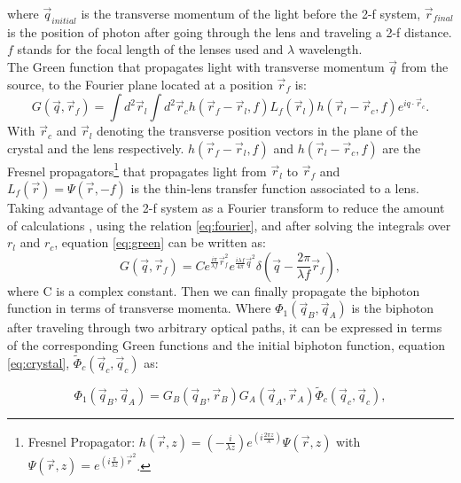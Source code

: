 where $\vec{q}_{initial}$ is the transverse momentum of the light before the 2-f system, $\vec{r}_{final}$ is the position of photon
after going through the lens and traveling a 2-f distance. $f$ stands for the focal length of the lenses used and $\lambda$ wavelength.\\
The Green function that propagates light with transverse momentum $\vec{q}$ from the source, to the
Fourier plane located at a position $\vec{r}_f$ is\cite{green}:
\begin{equation}\label{eq:green}
G(\vec{q},\vec{r}_f) = \int d^2 \vec{r}_l \int d^2 \vec{r}_c h(\vec{r}_f - \vec{r}_l,f) L_f(\vec{r}_l) h(\vec{r}_l - \vec{r}_c,f) e^{i q \cdot \vec{r}_c}.
\end{equation}
With $\vec{r}_c$ and $\vec{r}_l$ denoting the transverse position vectors in the plane of the crystal and the 
lens respectively. $h(\vec{r}_f - \vec{r}_l,f)$ and $h(\vec{r}_l - \vec{r}_c,f)$ are the Fresnel propagators\footnote{Fresnel Propagator: $h(\vec{r},z)=(- \frac{i}{\lambda z})e^{(i \frac{2 \pi z}{\lambda})} \Psi (\vec{r},z)$ 
with $\Psi(\vec{r},z) = e^{(i \frac{\pi}{\lambda z })\vec{r}^2}$. } that propagates light from $\vec{r}_l$ to $\vec{r}_f$ and 
$L_f (\vec{r})=\Psi(\vec{r},-f)$ is the thin-lens transfer function associated to a lens\cite{green}.
 \\
Taking advantage of the 2-f system as a Fourier transform to reduce the amount of calculations
, using the relation \ref{eq:fourier}, and after solving the integrals over $r_l$ and $r_c$, equation
 \ref{eq:green} can be written as:
\begin{equation}
\label{eq:greenSolve}
G(\vec{q},\vec{r}_f)=C e^{\frac{i \pi}{\lambda f} \vec{r}_f^2} e^{\frac{i \lambda f}{4 \pi} \vec{q}^2} \delta ( \vec{q} - \frac{2 \pi}{\lambda f}\vec{r}_f),
\end{equation}
where C is a complex constant.
Then we can finally propagate  the biphoton function
in terms of transverse momenta. Where $\Phi_1 (\vec{q}_B , \vec{q}_A )$ is the biphoton after traveling
through two arbitrary optical paths, it can be expressed
in terms of the corresponding Green functions and the
initial biphoton function, equation \ref{eq:crystal}, $\tilde{\Phi}_c(\vec{q}_c,\vec{q}_c)$ as:

\begin{equation}\label{eq:final}
\Phi_1 (\vec{q}_B , \vec{q}_A )= G_B(\vec{q}_B,\vec{r}_B) G_A(\vec{q}_A,\vec{r}_A) \tilde{\Phi}_c(\vec{q}_c,\vec{q}_c),
\end{equation}





